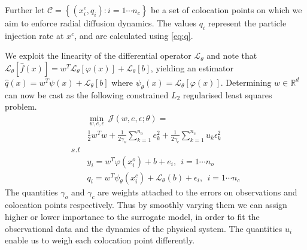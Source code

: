 Further let $\mathcal{C} = \left\{ (x^{c}_{i}, q_{i}): i = 1 \cdots n_{c} \right\}$ be a set of 
colocation points on which we aim to enforce radial diffusion dynamics. The values $q_{i}$ 
represent the particle injection rate at $x^c$, and are calculated using \cref{eq:q}.

We exploit the linearity of the differential operator $\mathcal{L}_{\theta}$ and note that 
$\mathcal{L}_{\theta} [\hat{f}(x)] = w^{T} \mathcal{L}_{\theta}[\varphi(x)] + \mathcal{L}_{\theta}[b]$, 
yielding an estimator 
$\hat{q}(x) = w^{T}\psi(x) + \mathcal{L}_{\theta}[b]$ where $\psi_{\theta}(x) = \mathcal{L}_{\theta}[\varphi(x)]$. 
Determining $w \in \mathbb{R}^d$ can now be cast as the following constrained $L_2$ regularised 
least squares problem.
%
\begin{equation}\label{eq:surrogate}
   \begin{aligned}
    & \min_{w,e,\epsilon} \ \mathcal{J}(w,e,\epsilon;\theta) = \\
    & \frac{1}{2} w^{T}w + \frac{1}{2\gamma_{o}} \sum_{k = 1}^{n_{o}}{e^{2}_{k}} + 
      \frac{1}{2\gamma_{c}} \sum_{k = 1}^{n_{c}}{u_{k} \epsilon^{2}_{k}} \\
    s.t & \\
    & y_{i}  = w^{T}\varphi(x^{o}_{i}) + b + e_{i}, \ \ i = 1 \cdots n_{o} \\
    & q_{i} = w^{T}\psi_{\theta}(x^{c}_{i}) + \mathcal{L}_{\theta}(b) + \epsilon_{i}, \ \ i = 1 \cdots n_{c}
   \end{aligned}
\end{equation}
%
The quantities $\gamma_{o}$ and $\gamma_{c}$ are weights attached to the errors on observations and 
colocation points respectively. Thus by smoothly varying them we can assign higher or lower 
importance to the surrogate model, in order to fit the observational data and the dynamics of the 
physical system. The quantities $u_i$ enable us to weigh each colocation point differently. 

